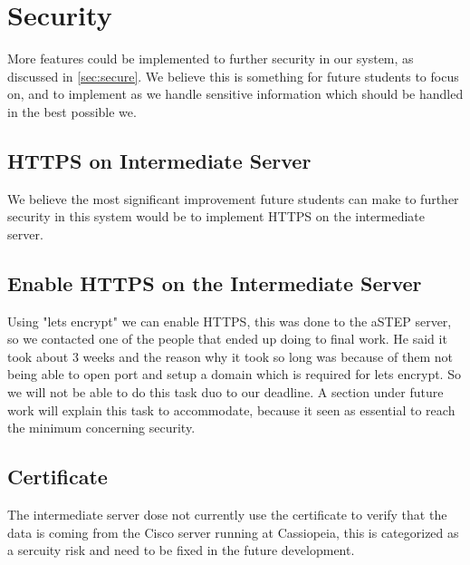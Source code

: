 \section{Security}\label{sec:fucture_secure}
More features could be implemented to further security in our system, as discussed in \cref{sec:secure}. We believe this is something for future students to focus on, and to implement as we handle sensitive information which should be handled in the best possible we.

\subsection*{HTTPS on Intermediate Server}
We believe the most significant improvement future students can make to further security in this system would be to implement HTTPS on the intermediate server.
\subsection*{Enable HTTPS on the Intermediate Server}
Using "lets encrypt" we can enable HTTPS, this was done to the aSTEP server, so we contacted one of the people that ended up doing to final work. He said it took about 3 weeks and the reason why it took so long was because of them not being able to open port and setup a domain which is required for lets encrypt. So we will not be able to do this task duo to our deadline. A section under future work will explain this task to accommodate, because it seen as essential to reach the minimum concerning security.
\subsection*{Certificate}
The intermediate server dose not currently use the certificate to verify that the data is coming from the Cisco server running at Cassiopeia, this is categorized as a sercuity risk and need to be fixed in the future development.